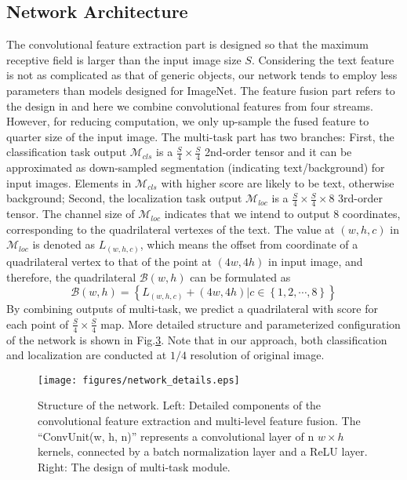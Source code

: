 \documentclass[10pt,twocolumn,letterpaper]{article}
\begin{document}
	\subsection{Network Architecture}
	\label{Sec.3.1}
	The convolutional feature extraction part is designed so that the maximum receptive field is larger than the input image size $S$. 
	Considering the text feature is not as complicated as that of generic objects, our network tends to employ less parameters than models designed for ImageNet.
	The feature fusion part refers to the design in \cite{fcn} and here we combine convolutional features from four streams.
	However, for reducing computation, we only up-sample the fused feature to quarter size of the input image.
	The multi-task part has two branches: 
	First, the classification task output $\mathcal{M}_{cls}$ is a $\frac{S}{4} \times \frac{S}{4}$ 2nd-order tensor and it can be approximated as down-sampled segmentation (indicating text/background) for input images. Elements in $\mathcal{M}_{cls}$ with higher score are likely to be text, otherwise background;
	Second, the localization task output $\mathcal{M}_{loc}$ is a $\frac{S}{4} \times \frac{S}{4} \times 8$ 3rd-order tensor.
	The channel size of $\mathcal{M}_{loc}$ indicates that we intend to output 8 coordinates, corresponding to the quadrilateral vertexes of the text. 
	The value at $\left(w, h, c\right)$ in $\mathcal{M}_{loc}$ is denoted as $L_{\left(w, h, c\right)}$, which means the offset from coordinate of a quadrilateral vertex to that of the point at $\left(4w, 4h\right)$ in input image, and therefore, the quadrilateral $\mathcal{B} \left(w, h\right)$ can be formulated as 
	\begin{equation}
		\mathcal{B} \left(w, h\right) \! = \! \left\{ L_{\left(w, h, c\right)} + \left(4w, 4h\right) \big| c \in \left\{1, 2, \cdots, 8 \right\}
		\right\}
	\end{equation}
	By combining outputs of multi-task, we predict a quadrilateral with score for each point of $\frac{S}{4} \times \frac{S}{4}$ map.
	More detailed structure and parameterized configuration of the network is shown in Fig.\hyperref[Fig.3]{3}. Note that in our approach, both classification and localization are conducted at $1/4$ resolution of original image.

	\begin{figure}
		\label{Fig.3}
		\centering
		\texttt{[image: figures/network\_details.eps]}
		\caption{Structure of the network. Left: Detailed components of the convolutional feature extraction and multi-level feature fusion. The ``ConvUnit(w, h, n)'' represents a convolutional layer of n $w \times h$ kernels, connected by a batch normalization layer and a ReLU layer. Right: The design of multi-task module.}
	\end{figure}
\end{document}
